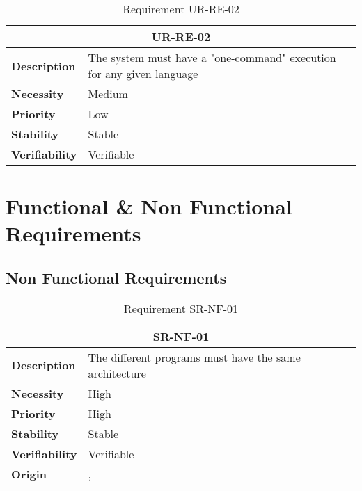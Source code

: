 \begin{table}[H]
    \centering
    \begin{tabular}{l p{10cm}}
        \toprule
        \multicolumn{2}{c}{UR-RE-02} \\
        \toprule
        \textbf{Description}        & The system must have a "one-command" execution for any given language \\
        \textbf{Necessity}          & Medium   \\
        \textbf{Priority}           & Low   \\
        \textbf{Stability}          & Stable \\
        \textbf{Verifiability}      & Verifiable \\
    \end{tabular}
    \caption{Requirement UR-RE-02}
    \label{tab:ur-re-02}
\end{table}


\section{Functional \& Non Functional Requirements}

\subsection{Non Functional Requirements}
\begin{table}[H]
    \centering
    \begin{tabular}{l p{10cm}}
        \toprule
        \multicolumn{2}{c}{SR-NF-01} \\
        \toprule
        \textbf{Description}        & The different programs must have the same architecture \\
        \textbf{Necessity}          &  High \\
        \textbf{Priority}           &  High \\
        \textbf{Stability}          &  Stable \\
        \textbf{Verifiability}      & Verifiable \\
        \textbf{Origin}             &  \textit{\nameref{tab:ur-re-01}}, \textit{\nameref{tab:ur-ca-14}} \\
    \end{tabular}
    \caption{Requirement SR-NF-01}
    \label{tab:sr-nf-01}
\end{table}

